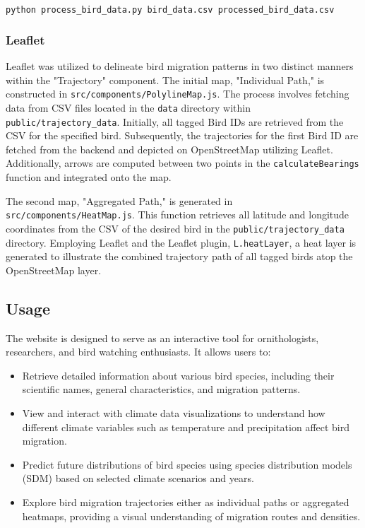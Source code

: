 \documentclass{article}
\begin{document}
\begin{lstlisting}[language=bash]
python process_bird_data.py bird_data.csv processed_bird_data.csv
\end{lstlisting}

\subsubsection*{Leaflet}
Leaflet was utilized to delineate bird migration patterns in two distinct manners within the "Trajectory" component. The initial map, "Individual Path," is constructed in \texttt{src/components/PolylineMap.js}. The process involves fetching data from CSV files located in the \texttt{data} directory within \texttt{public/trajectory_data}. Initially, all tagged Bird IDs are retrieved from the CSV for the specified bird. Subsequently, the trajectories for the first Bird ID are fetched from the backend and depicted on OpenStreetMap utilizing Leaflet. Additionally, arrows are computed between two points in the \texttt{calculateBearings} function and integrated onto the map.

The second map, "Aggregated Path," is generated in \texttt{src/components/HeatMap.js}. This function retrieves all latitude and longitude coordinates from the CSV of the desired bird in the \texttt{public/trajectory_data} directory. Employing Leaflet and the Leaflet plugin, \texttt{L.heatLayer}, a heat layer is generated to illustrate the combined trajectory path of all tagged birds atop the OpenStreetMap layer.


\subsection{Usage}
The website is designed to serve as an interactive tool for ornithologists, researchers, and bird watching enthusiasts. It allows users to:

\begin{itemize}
    \item Retrieve detailed information about various bird species, including their scientific names, general characteristics, and migration patterns.
    \item View and interact with climate data visualizations to understand how different climate variables such as temperature and precipitation affect bird migration.
    \item Predict future distributions of bird species using species distribution models (SDM) based on selected climate scenarios and years.
    \item Explore bird migration trajectories either as individual paths or aggregated heatmaps, providing a visual understanding of migration routes and densities.
\end{itemize}
\end{document}
